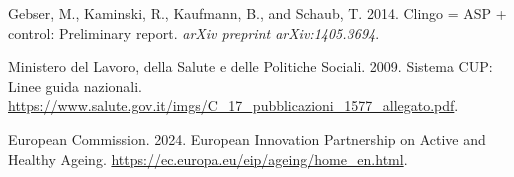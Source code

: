 \documentclass{tlp}
\begin{document}
\begin{thebibliography}{}
Gebser, M., Kaminski, R., Kaufmann, B., and Schaub, T. 2014.
Clingo = ASP + control: Preliminary report.
\textit{arXiv preprint arXiv:1405.3694}.

Ministero del Lavoro, della Salute e delle Politiche Sociali. 2009.
Sistema CUP: Linee guida nazionali.
\url{https://www.salute.gov.it/imgs/C_17_pubblicazioni_1577_allegato.pdf}.

European Commission. 2024.
European Innovation Partnership on Active and Healthy Ageing.
\url{https://ec.europa.eu/eip/ageing/home_en.html}.
\end{thebibliography}


\label{lastpage}
\end{document}
